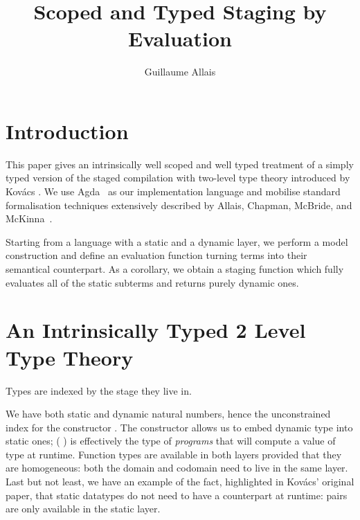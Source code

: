 \documentclass{article}
\title{Scoped and Typed Staging by Evaluation}
\author{Guillaume Allais}
\begin{document}
\maketitle

\section{Introduction}

This paper gives an intrinsically well scoped and well typed
treatment of a simply typed version of the staged compilation
with two-level type theory introduced by
Kov{\'{a}}cs \cite{DBLP:journals/pacmpl/Kovacs22}.
%
We use Agda~\cite{DBLP:conf/afp/Norell08}
as our implementation language and
mobilise standard formalisation
techniques extensively described by Allais, Chapman,
McBride, and McKinna~\cite{DBLP:conf/cpp/Allais0MM17}.

Starting from a language with a static and a dynamic layer,
we perform a model construction and define an evaluation
function turning terms into their semantical counterpart.
%
As a corollary, we obtain a staging function which
fully evaluates all of the static subterms and returns
purely dynamic ones.

\section{An Intrinsically Typed 2 Level Type Theory}

Types are indexed by the stage they live in.

\begin{minipage}[t]{.55\textwidth}
\end{minipage}\hfill
\begin{minipage}[t]{.4\textwidth}
\end{minipage}

We have both static and dynamic natural numbers,
hence the unconstrained index  for the
constructor .
%
The constructor  allows us to embed dynamic
type into static ones; ( ) is effectively
the type of \emph{programs} that will compute a value of
type  at runtime.
%
Function types are available in both layers provided that
they are homogeneous: both the domain and codomain need
to live in the same layer.
%
Last but not least, we have an example of the fact,
highlighted in Kov{\'{a}}cs' original paper, that static
datatypes do not need to have a counterpart at runtime:
pairs are only available in the static layer.
\end{document}
